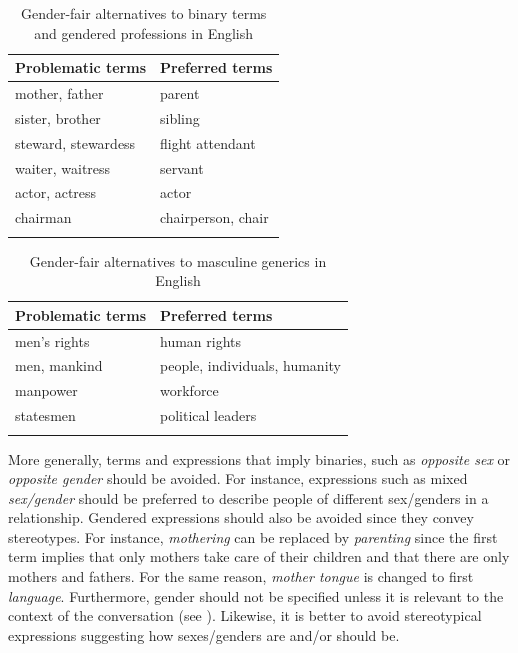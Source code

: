 \begin{table}
    \caption[Gender-fair alternatives to binary terms in English]{Gender-fair alternatives to binary terms and gendered professions in English \citep{apagenderenglish,europarlenglish}}
    \label{tab:genderenglish}
    \begin{tabular}{ll}
    \lsptoprule
        {Problematic terms}  &  {Preferred terms}  \\
\midrule
        mother, father & parent \\ 
        sister, brother & sibling \\ 
        steward, stewardess & flight attendant \\ 
        waiter, waitress & servant \\ 
        actor, actress & actor \\ 
        chairman & chairperson, chair \\
\lspbottomrule
    \end{tabular}
\end{table}


\begin{table}
    \caption[Gender-fair alternatives to masculine generics in English]{Gender-fair alternatives to masculine generics in English \citep{apagenderenglish,europarlenglish}} 
    \label{tab:malegenericsenglish}
    \begin{tabular}{ll}
    \lsptoprule
       \textbf{Problematic terms}  & \textbf{Preferred terms}  \\
\midrule
        men's rights & human rights \\  
        men, mankind & people, individuals, humanity \\ 
        manpower & workforce \\ 
        statesmen & political leaders \\
\lspbottomrule
    \end{tabular}
\end{table}


More generally, terms and expressions that imply binaries, such as \textit{opposite sex} or \textit{opposite gender} should be avoided. For instance, expressions such as mixed \textit{sex/gender} should be preferred to describe people of different sex/genders in a relationship. Gendered expressions should also be avoided since they convey stereotypes. For instance, \textit{mothering} can be replaced by \textit{parenting} since the first term implies that only mothers take care of their children and that there are only mothers and fathers. For the same reason, \textit{mother tongue} is changed to first \textit{language}. Furthermore, gender should not be specified unless it is relevant to the context of the conversation (see \cite{apagenderenglish}). Likewise, it is better to avoid stereotypical expressions suggesting how sexes/genders are and/or should be. 

